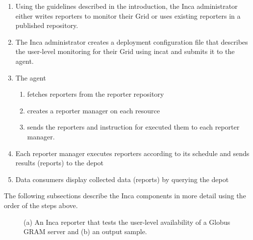 \documentclass[times,10pt,twocolumn]{article}
\begin{document}
\begin{enumerate}

\item Using the guidelines described in the introduction, the Inca
administrator either writes reporters to monitor their Grid or uses existing
reporters in a published repository.

\item The Inca administrator creates a deployment configuration file that
describes the user-level monitoring for their Grid using incat and submits it
to the agent.

\item The agent
  \begin{enumerate}
    \item fetches reporters from the reporter repository
    \item creates a reporter manager on each resource
    \item sends the reporters and instruction for executed them to each reporter manager.
  \end{enumerate}

\item Each reporter manager executes reporters according to its schedule and
sends results (reports) to the depot

\item Data consumers display collected data (reports) by querying the depot
\end{enumerate}

\noindent The following subsections describe the Inca components in more
detail using the order of the steps above.


\lstset{
  basicstyle=\scriptsize\ttfamily, 
  frame=single,
  keywordstyle=\textbf, 
  identifierstyle=, 
  commentstyle=\scriptsize\ttfamily, 
  stringstyle=\ttfamily, 
  numbers=left, 
  numberstyle=\scriptsize,
  stepnumber=2,
  firstnumber=1,
  showstringspaces=false} 
\begin{figure}
\lstset{language=Perl} 
\subfigure[]{}
\subfigure[]{}
\caption{\label{pingReporter}(a) An Inca reporter that tests the user-level
availability of a Globus GRAM server and (b) an output sample.}
\end{figure}
\end{document}
